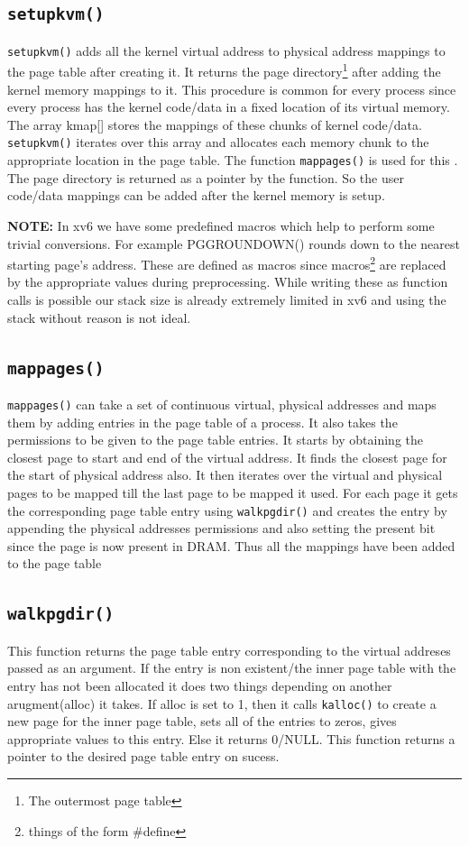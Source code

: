 \documentclass[12pt]{article}
\begin{document}
\subsection{\texttt{setupkvm()}}
\texttt{setupkvm()} adds all the kernel virtual address to physical address mappings to the page table after creating it. It returns the page directory\footnote{The outermost page table} after adding the kernel memory mappings to it.
This procedure is common for every process since every process has the kernel code/data in a fixed location of its virtual memory. The array kmap[] stores the mappings of these chunks of kernel code/data. \texttt{setupkvm()} iterates
over this array and allocates each memory chunk to the appropriate location in the page table. The function \texttt{mappages()} is used for this . The page directory is returned as a pointer by the function. So the user code/data mappings can be added after the kernel memory is setup.

\textbf{NOTE:} In xv6 we have some predefined macros which help to perform some trivial conversions. For example PGGROUNDOWN() rounds down to the nearest starting page's address. These are defined as macros since macros\footnote{things of the form \#define} are replaced by the appropriate values during preprocessing.
While writing these as function calls is possible our stack size is already extremely limited in xv6 and using the stack without reason is not ideal.
\subsection{\texttt{mappages()}}
\texttt{mappages()} can take a set of continuous virtual, physical addresses and maps them by adding entries in the page table of a process. It also takes the permissions to be given to the page table entries.
It starts by obtaining the closest page to start and end of the virtual address. It finds the closest page for the start of physical address also.
It then iterates over the virtual and physical pages to be mapped till the last page to be mapped it used. For each page it gets the corresponding page table entry using \texttt{walkpgdir()} and 
creates the entry by appending the physical addresses permissions and also setting the present bit since the page is now present in DRAM. Thus all the mappings have been added to the page table
\subsection{\texttt{walkpgdir()}}
This function returns the page table entry corresponding to the virtual addreses passed as an argument. If the entry is non existent/the inner page table with the entry has not been allocated it does two things depending
on another arugment(alloc) it takes. If alloc is set to 1, then it calls \texttt{kalloc()} to create a new page for the inner page table, sets all of the entries to zeros, gives appropriate values to this entry. Else it returns 0/NULL.
This function returns a pointer to the desired page table entry on sucess. 
\end{document}

